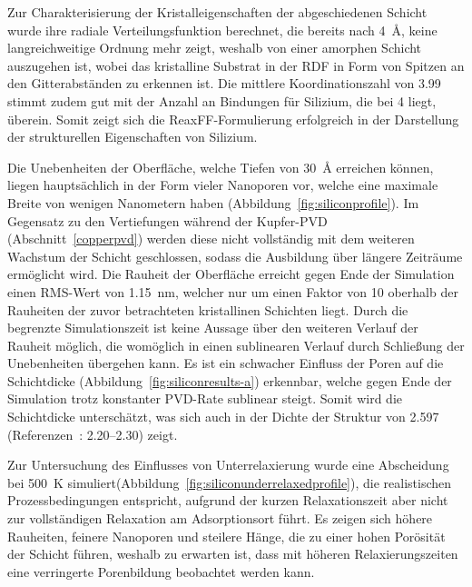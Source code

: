Zur Charakterisierung der Kristalleigenschaften der abgeschiedenen Schicht wurde ihre radiale Verteilungsfunktion berechnet, die bereits nach \SI{4}{\angstrom}, keine langreichweitige Ordnung mehr zeigt, weshalb von einer amorphen Schicht auszugehen ist, wobei das kristalline Substrat in der RDF in Form von Spitzen an den Gitterabständen zu erkennen ist.
Die mittlere Koordinationszahl von \num{3.99} stimmt zudem gut mit der Anzahl an Bindungen für Silizium, die bei \num{4} liegt, überein.
Somit zeigt sich die ReaxFF-Formulierung erfolgreich in der Darstellung der strukturellen Eigenschaften von Silizium.

Die Unebenheiten der Oberfläche, welche Tiefen von \SI{30}{\angstrom} erreichen können, liegen hauptsächlich in der Form vieler Nanoporen vor, welche eine maximale Breite von wenigen Nanometern haben (Abbildung~\ref{fig:siliconprofile}).
Im Gegensatz zu den Vertiefungen während der Kupfer-PVD (Abschnitt~\ref{copperpvd}) werden diese nicht vollständig mit dem weiteren Wachstum der Schicht geschlossen, sodass die Ausbildung über längere Zeiträume ermöglicht wird.
Die Rauheit der Oberfläche erreicht gegen Ende der Simulation einen RMS-Wert von \SI{1.15}{\nano\meter}, welcher nur um einen Faktor von \num{10} oberhalb der Rauheiten der zuvor betrachteten kristallinen Schichten liegt.
Durch die begrenzte Simulationszeit ist keine Aussage über den weiteren Verlauf der Rauheit möglich, die womöglich in einen sublinearen Verlauf durch Schließung der Unebenheiten übergehen kann.
Es ist ein schwacher Einfluss der Poren auf die Schichtdicke (Abbildung~\ref{fig:siliconresults-a}) erkennbar, welche gegen Ende der Simulation trotz konstanter PVD-Rate sublinear steigt.
Somit wird die Schichtdicke unterschätzt, was sich auch in der Dichte der Struktur von \SI{2.597}{\gpcc} (Referenzen~\cite{remes_optical_1998,renner_density_1973}: \SIrange{2.20}{2.30}{\gpcc}) zeigt.

Zur Untersuchung des Einflusses von Unterrelaxierung wurde eine Abscheidung bei \SI{500}{\kelvin} simuliert(Abbildung~\ref{fig:siliconunderrelaxedprofile}), die realistischen Prozessbedingungen entspricht, aufgrund der kurzen Relaxationszeit aber nicht zur vollständigen Relaxation am Adsorptionsort führt.
Es zeigen sich höhere Rauheiten, feinere Nanoporen und steilere Hänge, die zu einer hohen Porösität der Schicht führen, weshalb zu erwarten ist, dass mit höheren Relaxierungszeiten eine verringerte Porenbildung beobachtet werden kann.



